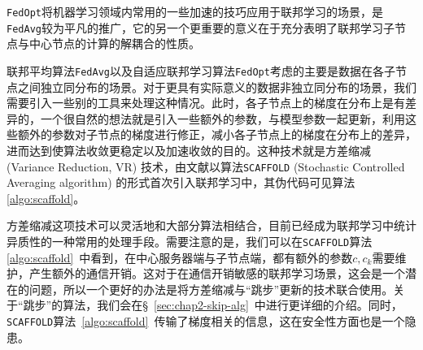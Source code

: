 \texttt{FedOpt}将机器学习领域内常用的一些加速的技巧应用于联邦学习的场景，是\texttt{FedAvg}较为平凡的推广，它的另一个更重要的意义在于充分表明了联邦学习子节点与中心节点的计算的解耦合的性质。

联邦平均算法\texttt{FedAvg}以及自适应联邦学习算法\texttt{FedOpt}考虑的主要是数据在各子节点之间独立同分布的场景。对于更具有实际意义的数据非独立同分布的场景，我们需要引入一些别的工具来处理这种情况。此时，各子节点上的梯度在分布上是有差异的，一个很自然的想法就是引入一些额外的参数，与模型参数一起更新，利用这些额外的参数对子节点的梯度进行修正，减小各子节点上的梯度在分布上的差异，进而达到使算法收敛更稳定以及加速收敛的目的。这种技术就是方差缩减 (Variance Reduction, VR) 技术\cite{johnson2013accelerating}，由文献\parencite{karimireddy2020scaffold}以算法\texttt{SCAFFOLD} (Stochastic Controlled Averaging algorithm) 的形式首次引入联邦学习中，其伪代码可见算法\ref{algo:scaffold}。



方差缩减这项技术可以灵活地和大部分算法相结合，目前已经成为联邦学习中统计异质性的一种常用的处理手段。需要注意的是，我们可以在\texttt{SCAFFOLD}算法\ref{algo:scaffold}~中看到，在中心服务器端与子节点端，都有额外的参数$c, c_k$需要维护，产生额外的通信开销。这对于在通信开销敏感的联邦学习场景，这会是一个潜在的问题，所以一个更好的办法是将方差缩减与``跳步''更新的技术联合使用\cite{proxskip-vr}。关于``跳步''的算法，我们会在\S~\ref{sec:chap2-skip-alg}~中进行更详细的介绍。同时，\texttt{SCAFFOLD}算法~\ref{algo:scaffold}~传输了梯度相关的信息，这在安全性方面\cite{zhu2019deep_leakage}也是一个隐患。
